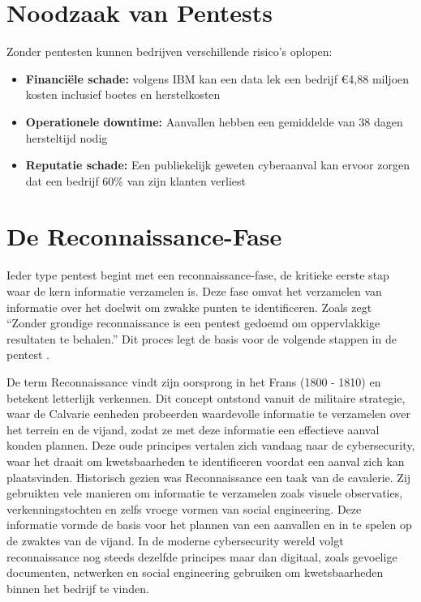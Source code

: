 \section{Noodzaak van Pentests}
Zonder pentesten kunnen bedrijven verschillende risico's oplopen:

\begin{itemize}
    \item \textbf{Financiële schade:} volgens IBM kan een data lek een bedrijf €4,88 miljoen kosten inclusief boetes en herstelkosten \autocite{IBM2023}
    \item \textbf{Operationele downtime:} Aanvallen hebben een gemiddelde van 38 dagen hersteltijd nodig \autocite{DBIR2023}
    \item \textbf{Reputatie schade:} Een publiekelijk geweten cyberaanval kan ervoor zorgen dat een bedrijf 60\% van zijn klanten verliest \autocite{Ponemon2022}
\end{itemize}

\section{De Reconnaissance-Fase}
Ieder type pentest begint met een reconnaissance-fase, de kritieke eerste stap waar de kern informatie verzamelen is. 
Deze fase omvat het verzamelen van informatie over het doelwit om zwakke punten te identificeren. 
Zoals \textcite{Shah} zegt ``Zonder grondige reconnaissance is een pentest gedoemd om oppervlakkige resultaten te behalen.''
Dit proces legt de basis voor de volgende stappen in de pentest \autocite{Kothia}.

De term Reconnaissance vindt zijn oorsprong in het Frans (1800 - 1810) en betekent letterlijk verkennen. 
Dit concept ontstond vanuit de militaire strategie, waar de Calvarie eenheden probeerden waardevolle informatie te verzamelen over het terrein en de vijand, zodat ze met deze informatie een effectieve aanval konden plannen.
Deze oude principes vertalen zich vandaag naar de cybersecurity, waar het draait om kwetsbaarheden te identificeren voordat een aanval zich kan plaatsvinden.
Historisch gezien was Reconnaissance een taak van de cavalerie. Zij gebruikten vele manieren om informatie te verzamelen zoals visuele observaties, verkenningstochten en zelfs vroege vormen van social engineering. 
Deze informatie vormde de basis voor het plannen van een aanvallen en in te spelen op de zwaktes van de vijand.
In de moderne cybersecurity wereld volgt reconnaissance nog steeds dezelfde principes maar dan digitaal, zoals gevoelige documenten, netwerken en social engineering gebruiken om kwetsbaarheden binnen het bedrijf te vinden.

